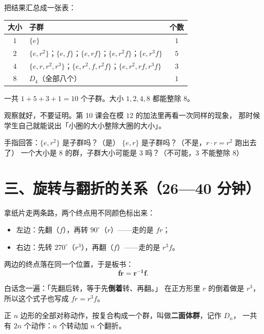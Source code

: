 把结果汇总成一张表：

\begin{center}
\begin{tabular}{@{}clc@{}}
  \toprule
  大小 & 子群 & 个数 \\
  \midrule
  \(1\) & \(\{e\}\) & \(1\) \\
  \(2\) & \(\{e,r^2\}\)；\(\{e,f\}\)；\(\{e,rf\}\)；\(\{e,r^2f\}\)；\(\{e,r^3f\}\) & \(5\) \\
  \(4\) & \(\{e,r,r^2,r^3\}\)；\(\{e,r^2,f,r^2f\}\)；\(\{e,r^2,rf,r^3f\}\) & \(3\) \\
  \(8\) & \(D_4\)（全部八个） & \(1\) \\
  \bottomrule
\end{tabular}
\end{center}

一共 \(1+5+3+1=10\) 个子群。大小 \(1,2,4,8\) 都能整除 \(8\)。

\begin{zhu}
  观察就好，不要证明。第 10 课会在模 \(12\) 的加法里再看一次同样的现象，
  那时候学生自己就能说出「小圈的大小整除大圈的大小」。
\end{zhu}

\begin{caozuo}
  手指回答：\(\{e,r^2\}\) 是子群吗？（是）
  \(\{e,r\}\) 是子群吗？（不是，\(r\cdot r=r^2\) 跑出去了）
  一个大小是 \(8\) 的群，子群大小可能是 \(3\) 吗？（不可能，\(3\) 不能整除 \(8\)）
\end{caozuo}

\section*{三、旋转与翻折的关系（26—40 分钟）}

\begin{caozuo}
  拿纸片走两条路，两个终点用不同颜色标出来：
  \begin{itemize}
    \item 左边：先翻（\(f\)），再转 \(90^\circ\)（\(r\)）——走的是 \(fr\)；
    \item 右边：先转 \(270^\circ\)（\(r^3\)），再翻（\(f\)）——走的是 \(r^3f\)。
  \end{itemize}
  两边的终点落在同一个位置，于是板书：
  \[
    \mathbf{fr=r^{-1}f} .
  \]
\end{caozuo}

白话念一遍：「先翻后转，等于先\textbf{倒着}转、再翻。」
在正方形里 \(r\) 的倒着做是 \(r^3\)，所以这个式子也写成 \(fr=r^3f\)。

\begin{dingli}[二面体群]
  正 \(n\) 边形的全部对称动作，按复合构成一个群，叫做\textbf{二面体群}，记作 \(D_n\)，
  一共有 \(2n\) 个动作：\(n\) 个转动加 \(n\) 个翻折。
\end{dingli}

